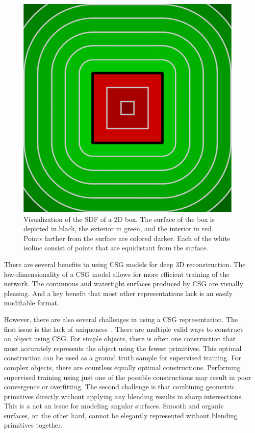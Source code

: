 \begin{figure}
	\centering
	\includegraphics[scale=0.2]{Images/SDF Box}
	\caption{Visualization of the SDF of a 2D box. The surface of the box is depicted in black, the exterior in green, and the interior in red. Points farther from the surface are colored darker. Each of the white isoline consist of points that are equidistant from the surface.}
	\label{fig:sdf_box}
\end{figure}

There are several benefits to using CSG models for deep 3D reconstruction. The low-dimensionality of a CSG model allows for more efficient training of the network. The continuous and watertight surfaces produced by CSG are visually pleasing. And a key benefit that most other representations lack is an easily modifiable format.

However, there are also several challenges in using a CSG representation. The first issue is the lack of uniqueness~\cite{Hughes2013}. There are multiple valid ways to construct an object using CSG. For simple objects, there is often one construction that most accurately represents the object using the fewest primitives. This optimal construction can be used as a ground truth sample for supervised training. For complex objects, there are countless equally optimal constructions. Performing supervised training using just one of the possible constructions may result in poor convergence or overfitting. The second challenge is that combining geometric primitives directly without applying any blending results in sharp intersections. This is a not an issue for modeling angular surfaces. Smooth and organic surfaces, on the other hard, cannot be elegantly represented without blending primitives together.

